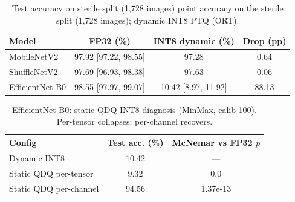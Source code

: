 \begin{table}[htbp]
\caption{Test accuracy on sterile split (1,728 images) point accuracy on the sterile split (1,728 images); dynamic INT8 PTQ (ORT).}
\label{tab:results}
\centering
\begin{tabular}{lccc}
\toprule
Model & FP32 (\%) & INT8 dynamic (\%) & Drop (pp) \\
\midrule
MobileNetV2 & 97.92 [97.22, 98.55] & 97.28 & 0.64 \\
ShuffleNetV2 & 97.69 [96.93, 98.38] & 97.63 & 0.06 \\
EfficientNet-B0 & 98.55 [97.97, 99.07] & 10.42 [8.97, 11.92] & 88.13 \\
\bottomrule
\end{tabular}
\end{table}

\begin{table}[htbp]
\caption{EfficientNet-B0: static QDQ INT8 diagnosis (MinMax, calib 100). Per-tensor collapses; per-channel recovers.}
\label{tab:eb0static}
\centering
\begin{tabular}{lcc}
\toprule
Config & Test acc. (\%) & McNemar vs FP32 $p$ \\
\midrule
Dynamic INT8 & 10.42 & --- \\
Static QDQ per-tensor & 9.32 & 0.0 \\
Static QDQ per-channel & 94.56 & 1.37e-13 \\
\bottomrule
\end{tabular}
\end{table}

\begin{table}[htbp]
\caption{Raspberry Pi~5 latency, batch=1 (mean of 200 runs, P50 in parentheses). ORT 1.29.0, throttled=0x0.}
\label{tab:rpi5}
\centering
\footnotesize
\setlength{\tabcolsep}{3.2pt}
\end{table}
